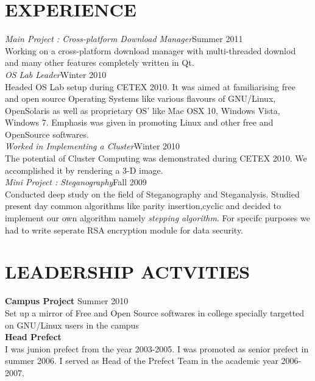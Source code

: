 \begin{resume}
\section{\textsc{EXPERIENCE}}{
  {\it Main Project : Cross-platform Download Manager}\hfill Summer 2011\\
  Working on a cross-platform download manager with multi-threaded downlod and many other features completely written in Qt.\\
  {\it OS Lab Leader}\hfill Winter 2010\\
  Headed OS Lab setup during CETEX 2010. It was aimed at familiarising free and open source Operating Systems like various flavours of
  GNU/Linux, OpenSolaris as well as proprietary OS' like Mac OSX 10, Windows Vista, Windows 7. Emphasis was given in promoting Linux and
  other free and OpenSource softwares.\\
  {\it Worked in Implementing a Cluster}\hfill Winter 2010\\
  The potential of Cluster Computing was demonstrated during CETEX 2010. We accomplished it by rendering a 3-D image.\\
  {\it Mini Project : Steganography}\hfill Fall 2009\\
  Conducted deep study on the field of Steganography and Steganalysis. Studied present day common algorithms like parity insertion,cyclic
  and decided to implement our own algorithm namely {\it stepping algorithm}. For specifc purposes we had to write seperate RSA encryption
  module for data security.\\
}

\section{\textsc{LEADERSHIP ACTVITIES}}{
  \textbf{Campus Project} \hfill Summer 2010\\
  Set up a mirror of Free and Open Source softwares in college specially targetted on GNU/Linux users in the campus\\
  \textbf{Head Prefect}\\
  I was junion prefect from the year 2003-2005. I was promoted as senior prefect in summer 2006. I served as Head of the Prefect Team in the academic year 2006-2007.\\
}


\end{resume}
